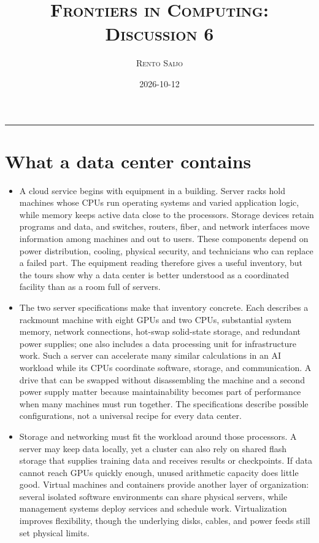 \documentclass[10pt]{article}
\title{\Large\textsc{Frontiers in Computing: Discussion 6}}
\author{\large\textsc{Rento Saijo}}
\date{2026-10-12}
\begin{document}
\maketitle
\thispagestyle{fancy}
\vspace{-1em}\rule{\linewidth}{0.6pt}\vspace{0.5em}

\section*{What a data center contains}

\begin{itemize}[leftmargin=1.25em, itemsep=0.3em, parsep=0pt, topsep=0pt]
    \item A cloud service begins with equipment in a building. Server racks hold machines whose CPUs run operating systems and varied application logic, while memory keeps active data close to the processors. Storage devices retain programs and data, and switches, routers, fiber, and network interfaces move information among machines and out to users. These components depend on power distribution, cooling, physical security, and technicians who can replace a failed part. The equipment reading therefore gives a useful inventory, but the tours show why a data center is better understood as a coordinated facility than as a room full of servers.

    \item The two server specifications make that inventory concrete. Each describes a rackmount machine with eight GPUs and two CPUs, substantial system memory, network connections, hot-swap solid-state storage, and redundant power supplies; one also includes a data processing unit for infrastructure work. Such a server can accelerate many similar calculations in an AI workload while its CPUs coordinate software, storage, and communication. A drive that can be swapped without disassembling the machine and a second power supply matter because maintainability becomes part of performance when many machines must run together. The specifications describe possible configurations, not a universal recipe for every data center.

    \item Storage and networking must fit the workload around those processors. A server may keep data locally, yet a cluster can also rely on shared flash storage that supplies training data and receives results or checkpoints. If data cannot reach GPUs quickly enough, unused arithmetic capacity does little good. Virtual machines and containers provide another layer of organization: several isolated software environments can share physical servers, while management systems deploy services and schedule work. Virtualization improves flexibility, though the underlying disks, cables, and power feeds still set physical limits.
\end{itemize}
\end{document}
